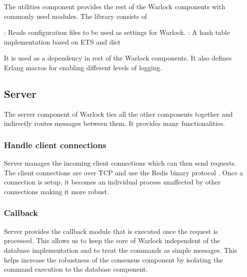 The utilities component provides the rest of the Warlock components with 
commonly used modules. The library consists of

\begin{itemize}
    : Reads configuration files to be used as 
    settings for Warlock.
    : A hash table implementation based on ETS%
    and dict%
\end{itemize}

It is used as a dependency in rest of the Warlock components. It also defines
Erlang macros%
for enabling different levels of logging.

\subsection{Server}

The server component of Warlock ties all the other components together and 
indirectly routes messages between them. It provides many functionalities.

\subsubsection{Handle client connections}

Server manages the incoming client connections which can then send requests. The
client connections are over TCP and use the Redis binary protocol 
\citep{RedisProtocol}%
. Once a connection is setup, it becomes an individual process unaffected by
other connections making it more robust.

\subsubsection{Callback}

Server provides the callback module that is executed once the request is 
processed. This allows us to keep the core of Warlock independent of the
database implementation and to treat the commands as simple messages. This
helps increase the robustness of the consensus component by isolating the
command execution to the database component.

